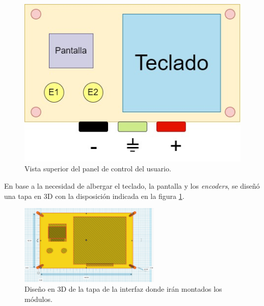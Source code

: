 \begin{figure}[H]
    \centering
    \includegraphics[scale=0.4]{./imagenes/caja_usuario.jpg}
    \caption{Vista superior del panel de control del usuario.}
    \label{F:caja_usuario}
\end{figure}
En base a la necesidad de albergar el teclado, la pantalla y los \textit{encoders}, se diseñó una tapa en 3D con la disposición indicada en la figura \ref{F:caja_usuario}. \par 
\begin{figure}[H]
    \centering
    \includegraphics[width=0.6\textwidth]{./imagenes/Tapa_interfaz.jpg}
    \caption{Diseño en 3D de la tapa de la interfaz donde irán montados los módulos.}
    \label{F:Tapa_interfaz}
\end{figure}

